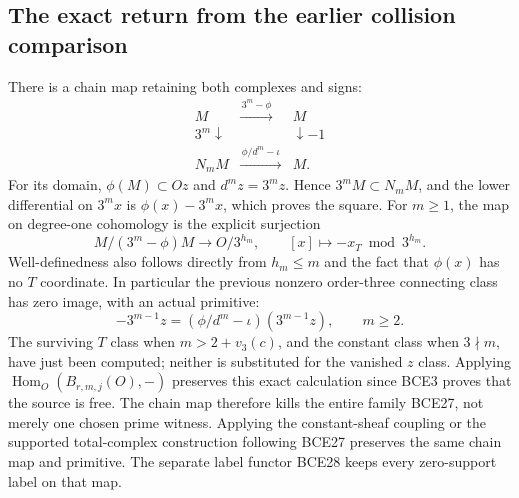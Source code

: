 \subsection{The exact return from the earlier collision comparison}

There is a chain map retaining both complexes and signs:
\begin{equation}\tag{BCE38}
\begin{array}{ccc}
M&\xrightarrow{\,3^m-\phi\,}&M\\
{\scriptstyle 3^m}\downarrow&&\downarrow{\scriptstyle -1}\\
N_mM&\xrightarrow{\,\phi/d^m-\iota\,}&M .
\end{array}
\end{equation}
For its domain, \(\phi(M)\subset Oz\) and
\(d^mz=3^mz\). Hence \(3^mM\subset N_mM\), and the
lower differential on \(3^mx\) is \(\phi(x)-3^mx\),
which proves the square. For \(m\ge1\), the map on
degree-one cohomology is the explicit surjection
\begin{equation}\tag{BCE39}
M/(3^m-\phi)M\longrightarrow O/3^{h_m},\qquad
[x]\longmapsto-x_T\bmod3^{h_m}.
\end{equation}
Well-definedness also follows directly from \(h_m\le m\)
and the fact that \(\phi(x)\) has no \(T\) coordinate.
In particular the previous nonzero order-three connecting
class has zero image, with an actual primitive:
\begin{equation}\tag{BCE40}
-3^{m-1}z
=(\phi/d^m-\iota)(3^{m-1}z),\qquad m\ge2 .
\end{equation}
The surviving \(T\) class when \(m>2+v_3(c)\), and the
constant class when \(3\nmid m\), have just been computed;
neither is substituted for the vanished \(z\) class.
Applying \(\operatorname{Hom}_O(B_{r,m,j}(O),-)\) preserves
this exact calculation since BCE3 proves that the source
is free. The chain map therefore kills the entire family
BCE27, not merely one chosen prime witness. Applying the
constant-sheaf coupling or the supported total-complex
construction following BCE27 preserves the same chain
map and primitive. The separate label functor BCE28
keeps every zero-support label on that map.

